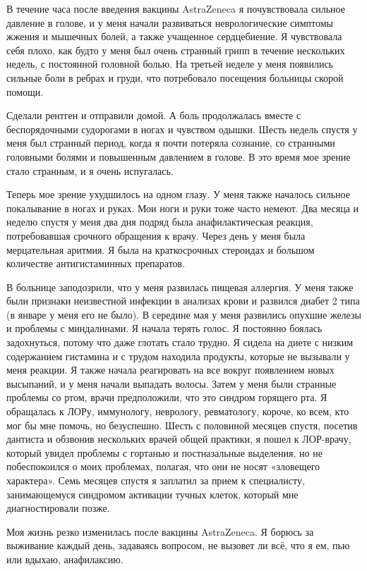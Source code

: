 В течение часа после введения вакцины AstraZeneca я почувствовала сильное
давление в голове, и у меня начали развиваться неврологические симптомы жжения и
мышечных болей, а также учащенное сердцебиение. Я чувствовала себя плохо, как
будто у меня был очень странный грипп в течение нескольких недель, с постоянной
головной болью. На третьей неделе у меня появились сильные боли в ребрах и
груди, что потребовало посещения больницы скорой помощи.

Сделали рентген и отправили домой. А боль продолжалась вместе с беспорядочными
судорогами в ногах и чувством одышки. Шесть недель спустя у меня был странный
период, когда я почти потеряла сознание, со странными головными болями и
повышенным давлением в голове. В это время мое зрение стало странным, и я очень
испугалась.

Теперь мое зрение ухудшилось на одном глазу. У меня также началось сильное
покалывание в ногах и руках. Мои ноги и руки тоже часто немеют. Два месяца и
неделю спустя у меня два дня подряд была анафилактическая реакция, потребовавшая
срочного обращения к врачу. Через день у меня была мерцательная аритмия. Я была
на краткосрочных стероидах и большом количестве антигистаминных препаратов.

В больнице заподозрили, что у меня развилась пищевая аллергия. У меня также были
признаки неизвестной инфекции в анализах крови и развился диабет 2 типа (в
январе у меня его не было). В середине мая у меня развились опухшие железы и
проблемы с миндалинами. Я начала терять голос. Я постоянно боялась задохнуться,
потому что даже глотать стало трудно. Я сидела на диете с низким содержанием
гистамина и с трудом находила продукты, которые не вызывали у меня реакции. Я
также начала реагировать на все вокруг появлением новых высыпаний, и у меня
начали выпадать волосы. Затем у меня были странные проблемы со ртом, врачи
предположили, что это синдром горящего рта. Я обращалась к ЛОРу, иммунологу,
неврологу, ревматологу, короче, ко всем, кто мог бы мне помочь, но
безуспешно. Шесть с половиной месяцев спустя, посетив дантиста и обзвонив
нескольких врачей общей практики, я пошел к ЛОР-врачу, который увидел проблемы с
гортанью и постназальные выделения, но не побеспокоился о моих проблемах,
полагая, что они не носят «зловещего характера». Семь месяцев спустя я заплатил
за прием к специалисту, занимающемуся синдромом активации тучных клеток, который
мне диагностировали позже.

Моя жизнь резко изменилась после вакцины AstraZeneca. Я борюсь за выживание
каждый день, задаваясь вопросом, не вызовет ли всё, что я ем, пью или вдыхаю,
анафилаксию.

